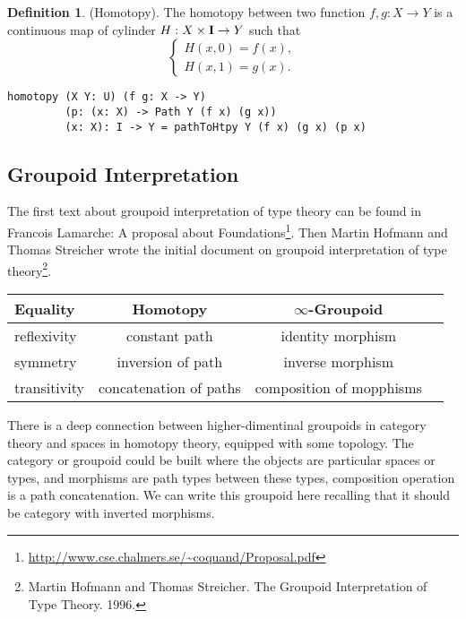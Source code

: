 \documentclass{article}
\theoremstyle{definition}
\newtheorem{definition}{Definition}
\begin{document}
\begin{definition} (Homotopy). The homotopy between two function $f,g: X \rightarrow Y$
is a continuous map of cylinder $H : X \times {\bf I} \rightarrow Y$ such that
$$
\begin{cases}
H(x,0)=f(x), \\
H(x,1)=g(x).
\end{cases}
$$
\begin{lstlisting}
homotopy (X Y: U) (f g: X -> Y)
         (p: (x: X) -> Path Y (f x) (g x))
         (x: X): I -> Y = pathToHtpy Y (f x) (g x) (p x)
\end{lstlisting}
\end{definition}

\newpage
\subsection{Groupoid Interpretation}
The first text about groupoid interpretation of type theory can be found in Francois Lamarche:
A proposal about Foundations\footnote{\url{http://www.cse.chalmers.se/~coquand/Proposal.pdf}}.
Then Martin Hofmann and Thomas Streicher wrote the initial
document on groupoid interpretation of type
theory\footnote{Martin Hofmann and Thomas Streicher. The Groupoid Interpretation of Type Theory. 1996.}.

\begin{table}[H]
\begin{center}
\begin{tabular}{lccc}
\hline
{\bf Equality} & {\bf Homotopy} & {\bf $\infty$-Groupoid} \\
\hline
reflexivity  & constant path & identity morphism \\
symmetry     & inversion of path & inverse morphism \\
transitivity & concatenation of paths & composition of mopphisms \\
\hline
\end{tabular}
\end{center}
\end{table}

There is a deep connection between higher-dimentinal groupoids in category theory and
spaces in homotopy theory, equipped with some topology. The category or groupoid could
be built where the objects are particular spaces or types, and morphisms are path types
between these types, composition operation is a path concatenation. We can write this
groupoid here recalling that it should be category with inverted morphisms.
\end{document}
